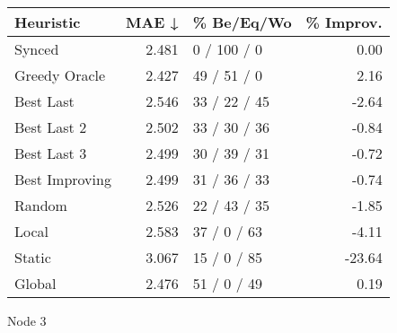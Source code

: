 \begin{tabular}{lrlr}
\toprule
\textbf{Heuristic} & \textbf{MAE ↓} & \textbf{\% Be/Eq/Wo} & \textbf{\% Improv.} \\
\midrule
            Synced &          2.481 &          0 / 100 / 0 &                0.00 \\
     Greedy Oracle &          2.427 &          49 / 51 / 0 &                2.16 \\
         Best Last &          2.546 &         33 / 22 / 45 &               -2.64 \\
       Best Last 2 &          2.502 &         33 / 30 / 36 &               -0.84 \\
       Best Last 3 &          2.499 &         30 / 39 / 31 &               -0.72 \\
    Best Improving &          2.499 &         31 / 36 / 33 &               -0.74 \\
            Random &          2.526 &         22 / 43 / 35 &               -1.85 \\
             Local &          2.583 &          37 / 0 / 63 &               -4.11 \\
            Static &          3.067 &          15 / 0 / 85 &              -23.64 \\
            Global &          2.476 &          51 / 0 / 49 &                0.19 \\
\bottomrule
\end{tabular}
\caption{Node 3}
\label{tab:hr_iid_lr05_le2_bs4_3}
